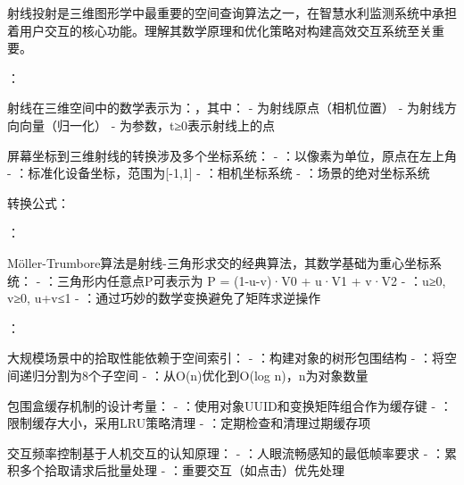 
射线投射是三维图形学中最重要的空间查询算法之一，在智慧水利监测系统中承担着用户交互的核心功能。理解其数学原理和优化策略对构建高效交互系统至关重要。

：


射线在三维空间中的数学表示为：，其中： - 为射线原点（相机位置） - 为射线方向向量（归一化） - 为参数，t≥0表示射线上的点


屏幕坐标到三维射线的转换涉及多个坐标系统： - ：以像素为单位，原点在左上角 - ：标准化设备坐标，范围为{[}-1,1{]} - ：相机坐标系统 - ：场景的绝对坐标系统

转换公式：

：


Möller-Trumbore算法是射线-三角形求交的经典算法，其数学基础为重心坐标系统： - ：三角形内任意点P可表示为 P = (1-u-v)·V0 + u·V1 + v·V2 - ：u≥0, v≥0, u+v≤1 - ：通过巧妙的数学变换避免了矩阵求逆操作

：


大规模场景中的拾取性能依赖于空间索引： - ：构建对象的树形包围结构 - ：将空间递归分割为8个子空间 - ：从O(n)优化到O(log n)，n为对象数量


包围盒缓存机制的设计考量： - ：使用对象UUID和变换矩阵组合作为缓存键 - ：限制缓存大小，采用LRU策略清理 - ：定期检查和清理过期缓存项


交互频率控制基于人机交互的认知原理： - ：人眼流畅感知的最低帧率要求 - ：累积多个拾取请求后批量处理 - ：重要交互（如点击）优先处理

